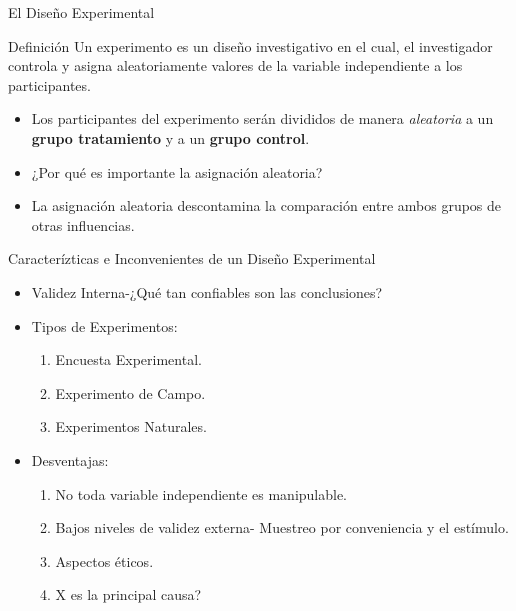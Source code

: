 \documentclass[xcolor=dvipsnames]{beamer}
\begin{document}
\begin{frame}{El Diseño Experimental}
	\begin{block}{Definición}
		\centering
Un experimento es un diseño investigativo en el cual, el investigador controla y asigna aleatoriamente valores de la variable independiente a los participantes.
	\end{block}
	\begin{itemize}
		\justifying
		\item Los participantes del experimento serán divididos de manera \emph{aleatoria} a un {\bf grupo tratamiento} y a un {\bf grupo control}.
		\item ¿Por qué es importante la asignación aleatoria?
\pause		\item La asignación aleatoria descontamina la comparación entre ambos grupos de otras influencias.
	\end{itemize}
\end{frame}

\begin{frame}{Caracterízticas e Inconvenientes de un Diseño Experimental}
\begin{itemize}
\justifying
\item Validez Interna-¿Qué tan confiables son las conclusiones?
\item Tipos de Experimentos:
\begin{enumerate}
\item Encuesta Experimental.
\item Experimento de Campo.
\item Experimentos Naturales.
	
\end{enumerate}
\item Desventajas:
\begin{enumerate}
\item No toda variable independiente es manipulable. 
\item Bajos niveles de validez externa- Muestreo por conveniencia y el estímulo.
\item Aspectos éticos.
\item X es la principal causa?
\end{enumerate}
\end{itemize}
\end{frame}
\end{document}
